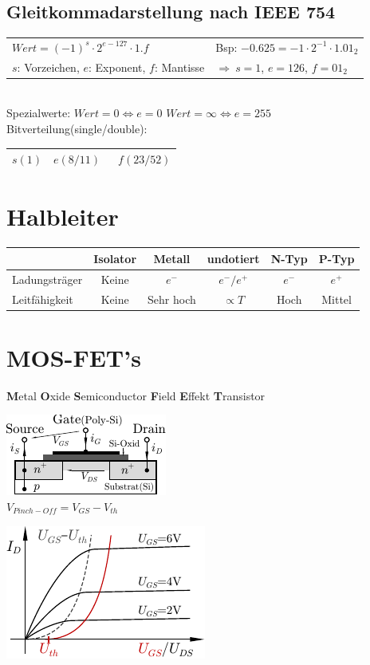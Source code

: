 \documentclass[6pt,a4paper]{scrartcl}
\newcommand{\Ra}[0]{\ensuremath{\Rightarrow}}									%
\begin{document}
\begin{multicols}{3}
	\subsection{Gleitkommadarstellung nach IEEE 754}
	\begin{tabular}{l|l}
		$Wert = (-1)^s \cdot 2^{e-127} \cdot 1.f$ & Bsp: $-0.625 = -1 \cdot 2^{-1} \cdot 1.01_2$\\
		$s$: Vorzeichen, $e$: Exponent, $f$: Mantisse & $\Ra\ s = 1$, $e = 126$, $f = 01_2$\\ 
	\end{tabular}
	\\[0.5em]
	Spezialwerte: $Wert = 0 \Leftrightarrow e=0$ \qquad $Wert = \infty \Leftrightarrow e=255$ \\
	Bitverteilung(single/double):\\
	\begin{tabular}{|c|c|c|} \hline 
		$s(1)$ & \quad $e(8/11)$ \quad\qquad & \qquad\qquad\qquad\ $f(23/52)$ \qquad\qquad\qquad\qquad \\ \hline
	\end{tabular}

\section{Halbleiter}
\begin{tabular}{l|c|c|c|c|c}
	& Isolator & Metall & undotiert & N-Typ & P-Typ \\ \hline
	Ladungsträger & Keine & $e^-$ & $e^- / e^+$ & $e^-$ & $e^+$ \\
	Leitfähigkeit & Keine & Sehr hoch & $\propto T$ & Hoch & Mittel\\  
\end{tabular}


\section{MOS-FET's}
\textbf{M}etal \textbf{O}xide \textbf{S}emiconductor \textbf{F}ield \textbf{E}ffekt \textbf{T}ransistor\\
\parbox{4.0cm}{ \includegraphics{./img/ds/mosfet.pdf} \\ $V_{Pinch-Off} = V_{GS} - V_{th}$ } \parbox{3.0cm}{ \includegraphics{./img/ds/char_nmos.pdf} } 



\end{multicols}
\end{document}

